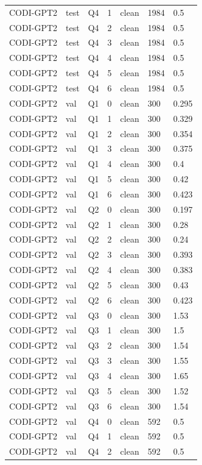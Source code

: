 \begin{longtable}{@{}p{}p{}p{}p{}p{}p{}p{}@{}}
CODI-GPT2 & test & Q4 & 1 & clean & 1984 & 0.5 \\
CODI-GPT2 & test & Q4 & 2 & clean & 1984 & 0.5 \\
CODI-GPT2 & test & Q4 & 3 & clean & 1984 & 0.5 \\
CODI-GPT2 & test & Q4 & 4 & clean & 1984 & 0.5 \\
CODI-GPT2 & test & Q4 & 5 & clean & 1984 & 0.5 \\
CODI-GPT2 & test & Q4 & 6 & clean & 1984 & 0.5 \\
CODI-GPT2 & val & Q1 & 0 & clean & 300 & 0.295 \\
CODI-GPT2 & val & Q1 & 1 & clean & 300 & 0.329 \\
CODI-GPT2 & val & Q1 & 2 & clean & 300 & 0.354 \\
CODI-GPT2 & val & Q1 & 3 & clean & 300 & 0.375 \\
CODI-GPT2 & val & Q1 & 4 & clean & 300 & 0.4 \\
CODI-GPT2 & val & Q1 & 5 & clean & 300 & 0.42 \\
CODI-GPT2 & val & Q1 & 6 & clean & 300 & 0.423 \\
CODI-GPT2 & val & Q2 & 0 & clean & 300 & 0.197 \\
CODI-GPT2 & val & Q2 & 1 & clean & 300 & 0.28 \\
CODI-GPT2 & val & Q2 & 2 & clean & 300 & 0.24 \\
CODI-GPT2 & val & Q2 & 3 & clean & 300 & 0.393 \\
CODI-GPT2 & val & Q2 & 4 & clean & 300 & 0.383 \\
CODI-GPT2 & val & Q2 & 5 & clean & 300 & 0.43 \\
CODI-GPT2 & val & Q2 & 6 & clean & 300 & 0.423 \\
CODI-GPT2 & val & Q3 & 0 & clean & 300 & 1.53 \\
CODI-GPT2 & val & Q3 & 1 & clean & 300 & 1.5 \\
CODI-GPT2 & val & Q3 & 2 & clean & 300 & 1.54 \\
CODI-GPT2 & val & Q3 & 3 & clean & 300 & 1.55 \\
CODI-GPT2 & val & Q3 & 4 & clean & 300 & 1.65 \\
CODI-GPT2 & val & Q3 & 5 & clean & 300 & 1.52 \\
CODI-GPT2 & val & Q3 & 6 & clean & 300 & 1.54 \\
CODI-GPT2 & val & Q4 & 0 & clean & 592 & 0.5 \\
CODI-GPT2 & val & Q4 & 1 & clean & 592 & 0.5 \\
CODI-GPT2 & val & Q4 & 2 & clean & 592 & 0.5 \\

\end{longtable}
